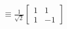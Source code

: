\documentclass[preview]{standalone}
\begin{document}
\begin{align*}
\equiv \frac{1}{\sqrt{2}} \begin{bmatrix} 1 & 1 \\ 1 & -1 \end{bmatrix}
\end{align*}
\end{document}
